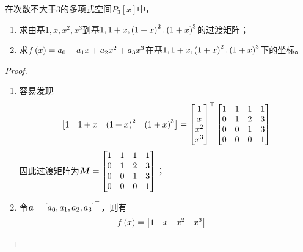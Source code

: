 \begin{problem}
在次数不大于\(3\)的多项式空间\(P_3[x]\)中，
\begin{enumerate}
    \item 求由基\(1,x,x^2,x^3\)到基\(1,1+x,\left( 1+x \right)^2,\left( 1+x \right)^3\)的过渡矩阵；
    \item 求\(f\left( x \right)=a_0+a_1x+a_2x^2+a_3x^3\)在基\(1,1+x,\left( 1+x \right)^2,\left( 1+x \right)^3\)下的坐标。
\end{enumerate}
\end{problem}
\begin{proof}
    \begin{enumerate}
        \item {
              容易发现
              \begin{equation*}
                  \begin{bmatrix}
                      1 & 1+x & \left( 1+x \right)^2 & \left( 1+x \right)^3
                  \end{bmatrix}=
                  \begin{bmatrix}
                      1 \\ x \\ x^2 \\ x^3
                  \end{bmatrix}^\top
                  \begin{bmatrix}
                      1 & 1 & 1 & 1 \\
                      0 & 1 & 2 & 3 \\
                      0 & 0 & 1 & 3 \\
                      0 & 0 & 0 & 1
                  \end{bmatrix}
              \end{equation*}
              因此过渡矩阵为\(\boldsymbol{M}=
              \begin{bmatrix}
                  1 & 1 & 1 & 1 \\
                  0 & 1 & 2 & 3 \\
                  0 & 0 & 1 & 3 \\
                  0 & 0 & 0 & 1
              \end{bmatrix}\)；
              }
        \item {
              令\(\boldsymbol{a}=\left[ a_0,a_1,a_2,a_3 \right]^\top\)，则有
              \begin{align*}
                  f\left( x \right)
                   & =
                  \begin{bmatrix}
                      1 & x & x^2 & x^3

\end{bmatrix}
\end{align*}}
\end{enumerate}
\end{proof}
